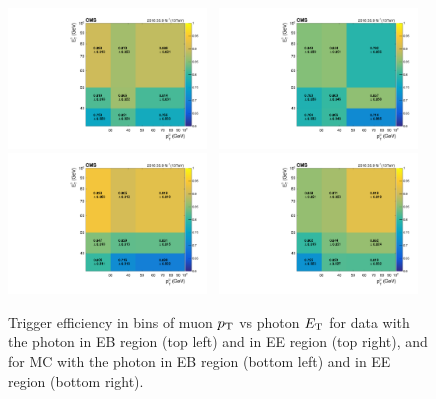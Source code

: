 		\begin{figure}[p]
		  \centering
		    \includegraphics[width=0.47\textwidth]{Fig/Trigger/HZZID/Efficiency_MuPt_PhoEt_EB_data}~
		    \includegraphics[width=0.47\textwidth]{Fig/Trigger/HZZID/Efficiency_MuPt_PhoEt_EE_data}\\
		    \includegraphics[width=0.47\textwidth]{Fig/Trigger/HZZID/Efficiency_MuPt_PhoEt_MC_DYJetsToLL_aMCatNLO_PU_nominal_EB}~
		    \includegraphics[width=0.47\textwidth]{Fig/Trigger/HZZID/Efficiency_MuPt_PhoEt_MC_DYJetsToLL_aMCatNLO_PU_nominal_EE}\\
		    \caption[Trigger Efficiency]{Trigger efficiency in bins of muon $p_{\mathrm{T}}$ vs photon $E_{\mathrm{T}}$ for data with the photon in EB region (top left) and in EE region (top right), and for MC with the photon in EB region (bottom left) and in EE region (bottom right).}
		    \label{fig:TrigEffsep}
		\end{figure}
		
